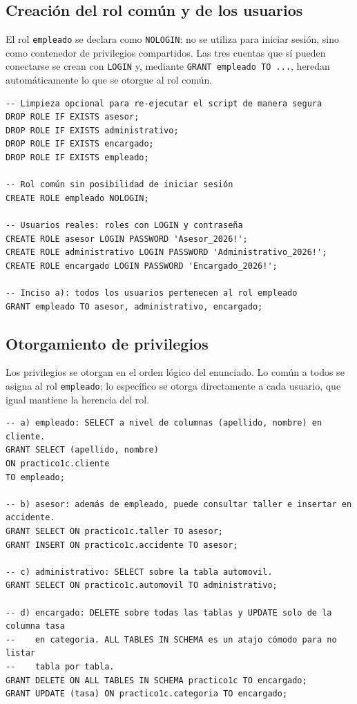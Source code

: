 \documentclass[11pt,a4paper]{article}
\begin{document}
\subsection{Creación del rol común y de los usuarios}

El rol \texttt{empleado} se declara como \texttt{NOLOGIN}: no se utiliza para iniciar sesión, sino como contenedor de privilegios compartidos. Las tres cuentas que sí pueden conectarse se crean con \texttt{LOGIN} y, mediante \texttt{GRANT empleado TO ...}, heredan automáticamente lo que se otorgue al rol común.

\begin{lstlisting}
-- Limpieza opcional para re-ejecutar el script de manera segura
DROP ROLE IF EXISTS asesor;
DROP ROLE IF EXISTS administrativo;
DROP ROLE IF EXISTS encargado;
DROP ROLE IF EXISTS empleado;

-- Rol común sin posibilidad de iniciar sesión
CREATE ROLE empleado NOLOGIN;

-- Usuarios reales: roles con LOGIN y contraseña
CREATE ROLE asesor LOGIN PASSWORD 'Asesor_2026!';
CREATE ROLE administrativo LOGIN PASSWORD 'Administrativo_2026!';
CREATE ROLE encargado LOGIN PASSWORD 'Encargado_2026!';

-- Inciso a): todos los usuarios pertenecen al rol empleado
GRANT empleado TO asesor, administrativo, encargado;
\end{lstlisting}

\subsection{Otorgamiento de privilegios}

Los privilegios se otorgan en el orden lógico del enunciado. Lo común a todos se asigna al rol \texttt{empleado}; lo específico se otorga directamente a cada usuario, que igual mantiene la herencia del rol.

\begin{lstlisting}
-- a) empleado: SELECT a nivel de columnas (apellido, nombre) en cliente.
GRANT SELECT (apellido, nombre)
ON practico1c.cliente
TO empleado;

-- b) asesor: además de empleado, puede consultar taller e insertar en accidente.
GRANT SELECT ON practico1c.taller TO asesor;
GRANT INSERT ON practico1c.accidente TO asesor;

-- c) administrativo: SELECT sobre la tabla automovil.
GRANT SELECT ON practico1c.automovil TO administrativo;

-- d) encargado: DELETE sobre todas las tablas y UPDATE solo de la columna tasa
--    en categoria. ALL TABLES IN SCHEMA es un atajo cómodo para no listar
--    tabla por tabla.
GRANT DELETE ON ALL TABLES IN SCHEMA practico1c TO encargado;
GRANT UPDATE (tasa) ON practico1c.categoria TO encargado;
\end{lstlisting}
\end{document}

